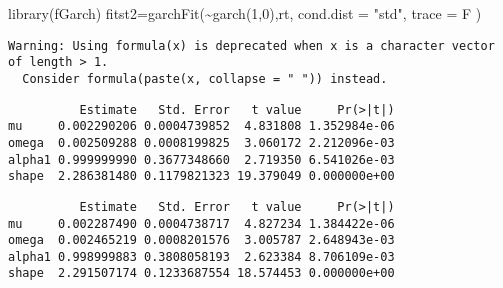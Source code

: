 \documentclass[
  ignorenonframetext,
]{beamer}
\newenvironment{Shaded}{\begin{snugshade}}{\end{snugshade}}
\newcommand{\AttributeTok}[1]{\textcolor[rgb]{0.77,0.63,0.00}{#1}}
\newcommand{\CommentTok}[1]{\textcolor[rgb]{0.56,0.35,0.01}{\textit{#1}}}
\newcommand{\DecValTok}[1]{\textcolor[rgb]{0.00,0.00,0.81}{#1}}
\newcommand{\FunctionTok}[1]{\textcolor[rgb]{0.00,0.00,0.00}{#1}}
\newcommand{\NormalTok}[1]{#1}
\newcommand{\OtherTok}[1]{\textcolor[rgb]{0.56,0.35,0.01}{#1}}
\newcommand{\SpecialCharTok}[1]{\textcolor[rgb]{0.00,0.00,0.00}{#1}}
\newcommand{\StringTok}[1]{\textcolor[rgb]{0.31,0.60,0.02}{#1}}
\newenvironment{Shaded}{\begin{snugshade}}{\end{snugshade}}
\newcommand{\AttributeTok}[1]{\textcolor[rgb]{0.77,0.63,0.00}{#1}}
\newcommand{\CommentTok}[1]{\textcolor[rgb]{0.56,0.35,0.01}{\textit{#1}}}
\newcommand{\DecValTok}[1]{\textcolor[rgb]{0.00,0.00,0.81}{#1}}
\newcommand{\FunctionTok}[1]{\textcolor[rgb]{0.00,0.00,0.00}{#1}}
\newcommand{\NormalTok}[1]{#1}
\newcommand{\OtherTok}[1]{\textcolor[rgb]{0.56,0.35,0.01}{#1}}
\newcommand{\SpecialCharTok}[1]{\textcolor[rgb]{0.00,0.00,0.00}{#1}}
\newcommand{\StringTok}[1]{\textcolor[rgb]{0.31,0.60,0.02}{#1}}
\begin{document}
\begin{frame}[fragile]
\begin{Shaded}
\begin{Highlighting}[]
\FunctionTok{library}\NormalTok{(fGarch)}
\NormalTok{fitst2}\OtherTok{=}\FunctionTok{garchFit}\NormalTok{(}\SpecialCharTok{\textasciitilde{}}\FunctionTok{garch}\NormalTok{(}\DecValTok{1}\NormalTok{,}\DecValTok{0}\NormalTok{),rt, }\AttributeTok{cond.dist =} \StringTok{"std"}\NormalTok{, }\AttributeTok{trace =}\NormalTok{ F )}
\end{Highlighting}
\end{Shaded}
\begin{verbatim}
Warning: Using formula(x) is deprecated when x is a character vector of length > 1.
  Consider formula(paste(x, collapse = " ")) instead.
\end{verbatim}
\begin{Shaded}
\end{Shaded}
\begin{verbatim}
          Estimate   Std. Error   t value     Pr(>|t|)
mu     0.002290206 0.0004739852  4.831808 1.352984e-06
omega  0.002509288 0.0008199825  3.060172 2.212096e-03
alpha1 0.999999990 0.3677348660  2.719350 6.541026e-03
shape  2.286381480 0.1179821323 19.379049 0.000000e+00
\end{verbatim}
\begin{Shaded}
\end{Shaded}
\begin{verbatim}
          Estimate   Std. Error   t value     Pr(>|t|)
mu     0.002287490 0.0004738717  4.827234 1.384422e-06
omega  0.002465219 0.0008201576  3.005787 2.648943e-03
alpha1 0.998999883 0.3808058193  2.623384 8.706109e-03
shape  2.291507174 0.1233687554 18.574453 0.000000e+00
\end{verbatim}
\end{frame}
\end{document}
